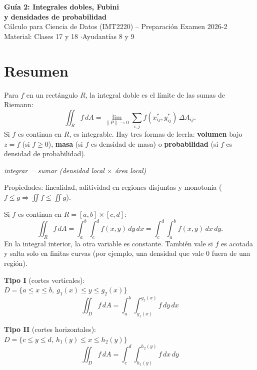 \documentclass[11pt,a4paper]{article}
\newcommand{\dA}{\,dA}
\begin{document}
\begin{center}
{\LARGE\bfseries Guía 2: Integrales dobles, Fubini\\[2pt] y densidades de probabilidad}\\[6pt]
{\large Cálculo para Ciencia de Datos (IMT2220) -- Preparación Examen 2026-2}\\[3pt]
{\small Material: Clases 17 y 18 \quad$\cdot$\quad Ayudantías 8 y 9}
\end{center}

\section{Resumen}

\begin{resumen}
Para $f$ en un rectángulo $R$, la integral doble es el límite de las sumas de Riemann:
\[
\iint_R f\dA=\lim_{\|P\|\to0}\sum_{i,j} f(x_{ij}^*,y_{ij}^*)\,\Delta A_{ij}.
\]
Si $f$ es continua en $R$, es integrable. Hay tres formas de leerla:
\textbf{volumen} bajo $z=f$ (si $f\ge0$), \textbf{masa} (si $f$ es densidad de masa) o \textbf{probabilidad} (si $f$ es densidad de probabilidad).
\begin{center}\emph{integrar = sumar (densidad local $\times$ área local)}\end{center}
Propiedades: linealidad, aditividad en regiones disjuntas y monotonía ($f\le g\Rightarrow\iint f\le\iint g$).
\end{resumen}

\begin{resumen}
Si $f$ es continua en $R=[a,b]\times[c,d]$:
\[
\iint_R f\dA=\int_a^b\!\!\int_c^d f(x,y)\,dy\,dx=\int_c^d\!\!\int_a^b f(x,y)\,dx\,dy.
\]
En la integral interior, la otra variable es constante. También vale si $f$ es acotada y salta solo en finitas curvas (por ejemplo, una densidad que vale 0 fuera de una región).
\end{resumen}

\begin{resumen}
\begin{minipage}{0.48\textwidth}
\textbf{Tipo I} (cortes verticales):\\
$D=\{a\le x\le b,\ g_1(x)\le y\le g_2(x)\}$
\[\iint_D f\dA=\int_a^b\!\!\int_{g_1(x)}^{g_2(x)} f\,dy\,dx\]
\end{minipage}\hfill
\begin{minipage}{0.48\textwidth}
\textbf{Tipo II} (cortes horizontales):\\
$D=\{c\le y\le d,\ h_1(y)\le x\le h_2(y)\}$
\[\iint_D f\dA=\int_c^d\!\!\int_{h_1(y)}^{h_2(y)} f\,dx\,dy\]
\end{minipage}
\end{resumen}
\end{document}
